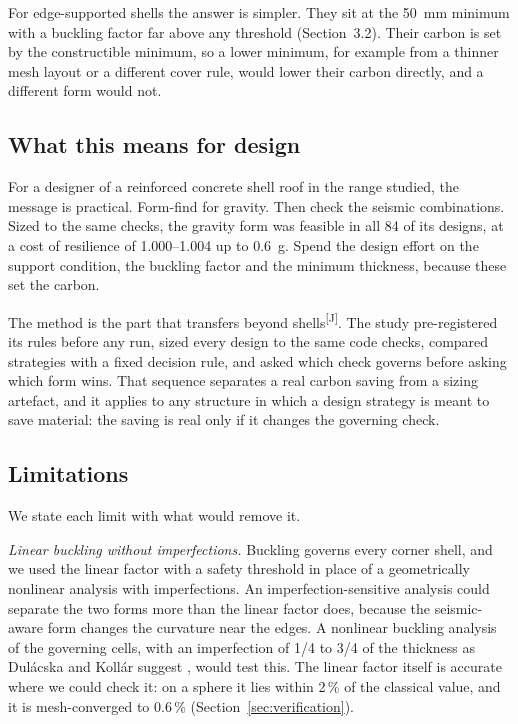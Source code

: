 \documentclass[preprint,12pt]{elsarticle}
\newcommand{\jud}{\textsuperscript{\textcolor{markcol}{\sffamily\scriptsize[J]}}}
\newcommand{\jud}{}
\begin{document}
For edge-supported shells the answer is simpler. They sit at the 50~mm minimum with a buckling factor far above any threshold (Section~3.2). Their carbon is set by the constructible minimum, so a lower minimum, for example from a thinner mesh layout or a different cover rule, would lower their carbon directly, and a different form would not.

\subsection{What this means for design}

For a designer of a reinforced concrete shell roof in the range studied, the message is practical. Form-find for gravity. Then check the seismic combinations. Sized to the same checks, the gravity form was feasible in all 84 of its designs, at a cost of resilience of 1.000--1.004 up to 0.6~g. Spend the design effort on the support condition, the buckling factor and the minimum thickness, because these set the carbon.

The method is the part that transfers beyond shells\jud. The study pre-registered its rules before any run, sized every design to the same code checks, compared strategies with a fixed decision rule, and asked which check governs before asking which form wins. That sequence separates a real carbon saving from a sizing artefact, and it applies to any structure in which a design strategy is meant to save material: the saving is real only if it changes the governing check.

\subsection{Limitations}

We state each limit with what would remove it.

\textit{Linear buckling without imperfections.} Buckling governs every corner shell, and we used the linear factor with a safety threshold in place of a geometrically nonlinear analysis with imperfections. An imperfection-sensitive analysis could separate the two forms more than the linear factor does, because the seismic-aware form changes the curvature near the edges. A nonlinear buckling analysis of the governing cells, with an imperfection of 1/4 to 3/4 of the thickness as Dul\'acska and Koll\'ar suggest \cite[p.~317]{Dulacska1995}, would test this. The linear factor itself is accurate where we could check it: on a sphere it lies within 2\,\% of the classical value, and it is mesh-converged to 0.6\,\% (Section~\ref{sec:verification}).
\end{document}
